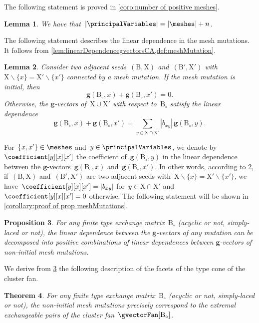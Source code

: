 \documentclass{amsart}
\newtheorem{theorem}{Theorem}[section]
\newtheorem{proposition}[theorem]{Proposition}
\newtheorem{lemma}[theorem]{Lemma}
\theoremstyle{definition}
\renewcommand{\b}[1]{{\boldsymbol{#1}}} %
\newcommand{\ssm}{\smallsetminus} %
\newcommand{\gvectorFull}[2]{\b{g}(#1,#2)} %
\newcommand{\cluster}{\mathrm{X}} %
\newcommand{\B}{\mathrm{B}} %
\begin{document}
The following statement is proved in \cref{coro:number of positive meshes}.

\begin{lemma}
\label{lem:bijectionMeshMutations}
We have that~$|\principalVariables| = |\meshes| + n$.
\end{lemma}

The following statement describes the linear dependence in the mesh mutations. It follows from \cref{lem:linearDependencegvectorsCA,def:meshMutation}.

\begin{lemma}
\label{lem:dependenceMesh}
Consider two adjacent seeds~${(\B, \cluster)}$ and~${(\B', \cluster')}$ with~$\cluster \ssm \{x\} = \cluster' \ssm \{x'\}$ connected by a mesh mutation.
If the mesh mutation is initial, then
\[
\gvectorFull{\B_\circ}{x} + \gvectorFull{\B_\circ}{x'} = 0.
\]
Otherwise, the $\b{g}$-vectors of~$\cluster \cup \cluster'$ with respect to~$\B_\circ$ satisfy the linear dependence
\[
\gvectorFull{\B_\circ}{x} + \gvectorFull{\B_\circ}{x'} = \sum_{y \in \cluster \cap \cluster'} |b_{xy}| \, \gvectorFull{\B_\circ}{y}.
\]
\end{lemma}

For~$\{x,x'\} \in \meshes$ and~$y \in \principalVariables$, we denote by~$\coefficient[y][x][x']$ the coefficient of~$\gvectorFull{\B_\circ}{y}$ in the linear dependence between the $\b{g}$-vectors~$\gvectorFull{\B_\circ}{x}$ and~$\gvectorFull{\B_\circ}{x'}$. In other words, according to \cref{lem:dependenceMesh}, if~${(\B, \cluster)}$ and~${(\B', \cluster')}$ are two adjacent seeds with~$\cluster \ssm \{x\} = \cluster' \ssm \{x'\}$, we have~$\coefficient[y][x][x'] = |b_{xy}|$ for~$y \in \cluster \cap \cluster'$ and~$\coefficient[y][x][x'] = 0$ otherwise.
The following statement will be shown in \cref{corollary:proof of prop meshMutations}.

\begin{proposition}
\label{prop:meshMutations}
For any finite type exchange matrix~$\B_\circ$ (acyclic or not, simply-laced or not), the linear dependence between the $\b{g}$-vectors of any mutation can be decomposed into positive combinations of linear dependences between $\b{g}$-vectors of non-initial mesh mutations.
\end{proposition}

We derive from \cref{prop:meshMutations} the following description of the facets of the type cone of the cluster fan.

\begin{theorem}
\label{thm:extremalExchangeablePairsCA}
For any finite type exchange matrix~$\B_\circ$ (acyclic or not, simply-laced or not), the non-initial mesh mutations precisely correspond to the extremal exchangeable pairs of the cluster fan~$\gvectorFan[\B_\circ]$.
\end{theorem}
\end{document}
